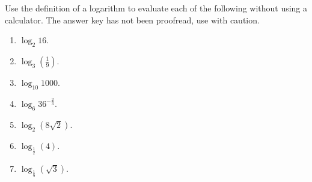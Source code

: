 Use the definition of a logarithm to evaluate each of the following without using a calculator. The answer key has not been proofread, use with caution.

\begin{multicols}{2}
\begin{enumerate}[ref={\fcProblemRef}]
\item $\displaystyle \log_2 16$.

\item $\displaystyle\log_3 \left(\frac{1}{9}\right)$.

\item $\displaystyle\log_{10} 1000$.

\item $\displaystyle\log_{6} 36^{-\frac{2}{3}}$.

\item $\displaystyle\log_{2} (8\sqrt{2})$.

\item $\displaystyle\log_{\frac{1}{2}} (4)$.

\item $\displaystyle\log_{\frac{1}{9}} (\sqrt{3})$.

\end{enumerate}
\end{multicols}
